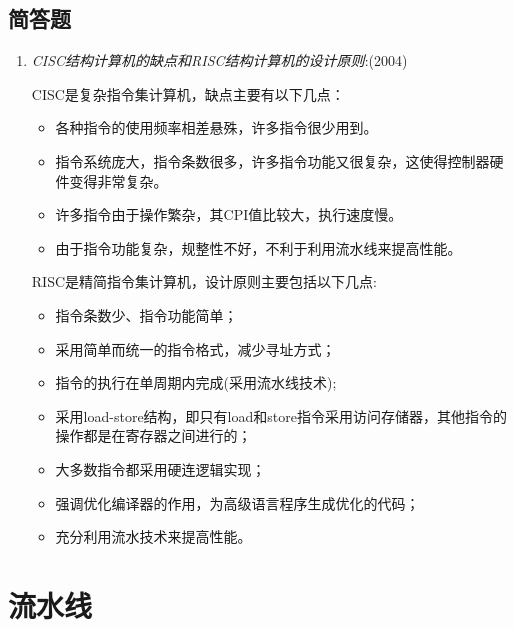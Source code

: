 \documentclass[a4paper]{ctexart}
\begin{document}
\subsection{简答题}
\begin{enumerate}
  \item \emph{CISC结构计算机的缺点和RISC结构计算机的设计原则}:(2004)
  
  CISC是复杂指令集计算机，缺点主要有以下几点：
  \begin{itemize}
    \item 各种指令的使用频率相差悬殊，许多指令很少用到。
    \item 指令系统庞大，指令条数很多，许多指令功能又很复杂，这使得控制器硬件变得非常复杂。
    \item 许多指令由于操作繁杂，其CPI值比较大，执行速度慢。
    \item 由于指令功能复杂，规整性不好，不利于利用流水线来提高性能。
  \end{itemize}
  
  RISC是精简指令集计算机，设计原则主要包括以下几点:
  \begin{itemize}
    \item 指令条数少、指令功能简单；
    \item 采用简单而统一的指令格式，减少寻址方式；
    \item 指令的执行在单周期内完成(采用流水线技术);
    \item 采用load-store结构，即只有load和store指令采用访问存储器，其他指令的操作都是在寄存器之间进行的；
    \item 大多数指令都采用硬连逻辑实现；
    \item 强调优化编译器的作用，为高级语言程序生成优化的代码；
    \item 充分利用流水技术来提高性能。
  \end{itemize}
\end{enumerate}

\newpage
\section{流水线}
\end{document}
